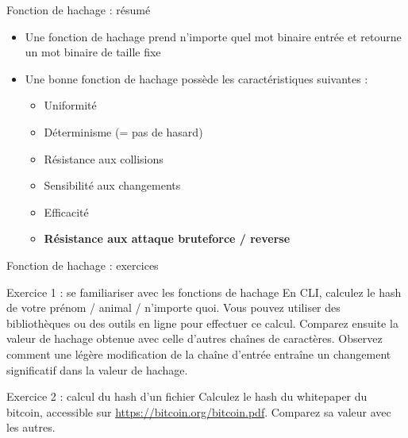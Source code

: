 \begin{frame}{Fonction de hachage : résumé}
  \begin{itemize}
    \item Une fonction de hachage prend n'importe quel mot binaire entrée et retourne un mot binaire de taille fixe
    \item Une bonne fonction de hachage possède les caractéristiques suivantes :
          \begin{itemize}
            \item Uniformité
            \item Déterminisme (= pas de hasard)
            \item Résistance aux collisions
            \item Sensibilité aux changements
            \item Efficacité
            \item \textbf{Résistance aux attaque bruteforce / reverse}
          \end{itemize}
  \end{itemize}
\end{frame}

\begin{frame}{Fonction de hachage : exercices}
  \begin{block}{Exercice 1 : se familiariser avec les fonctions de hachage}
    En CLI, calculez le hash de votre prénom / animal / n'importe quoi.
    Vous pouvez utiliser des bibliothèques ou des outils en ligne pour effectuer ce calcul.
    Comparez ensuite la valeur de hachage obtenue avec celle d'autres chaînes de caractères.
    Observez comment une légère modification de la chaîne d'entrée entraîne un changement significatif dans la valeur de hachage.
  \end{block}

  \begin{block}{Exercice 2 : calcul du hash d'un fichier}
    Calculez le hash du whitepaper du bitcoin, accessible sur \url{https://bitcoin.org/bitcoin.pdf}.
    Comparez sa valeur avec les autres.
  \end{block}
\end{frame}

